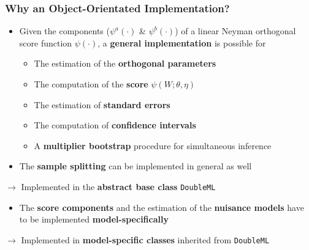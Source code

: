 \begin{frame}
\frametitle{Why an Object-Orientated Implementation?}
\begin{itemize}
\item Given the components ($\psi^a(\cdot)$ \& $\psi^b(\cdot)$) of a linear Neyman orthogonal score function $\psi(\cdot)$, a \textbf{general implementation} is possible for
\begin{itemize}
\item The estimation of the \textbf{orthogonal parameters}
\item The computation of the \textbf{score} $\psi(W; \theta, \eta)$
\item The estimation of \textbf{standard errors}
\item The computation of \textbf{confidence intervals}
\item A \textbf{multiplier bootstrap} procedure for simultaneous inference
\end{itemize}
\item The \textbf{sample splitting} can be implemented in general as well
\end{itemize}
$\rightarrow$ Implemented in the \textbf{abstract base class} \texttt{DoubleML}
\begin{itemize}
\item The \textbf{score components} and the estimation of the \textbf{nuisance models} have to be implemented \textbf{model-specifically}
\end{itemize}
$\rightarrow$ Implemented in \textbf{model-specific classes} inherited from \texttt{DoubleML}
\end{frame}


